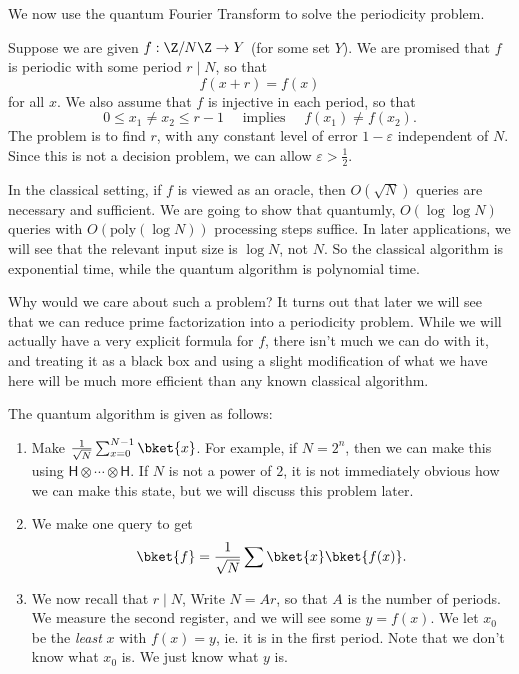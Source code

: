 \documentclass[a4paper]{article}
\newcommand{\qH}{\mathsf{H}}
\begin{document}
We now use the quantum Fourier Transform to solve the periodicity problem.
\begin{eg}
  Suppose we are given $f: \Z/N\Z \to Y$ (for some set $Y$). We are promised that $f$ is periodic with some period $r \mid N$, so that
  \[
    f(x + r) = f(x)
  \]
  for all $x$. We also assume that $f$ is injective in each period, so that
  \[
    0 \leq x_1 \not= x_2 \leq r - 1\quad\text{ implies }\quad f(x_1) \not= f(x_2).
  \]
  The problem is to find $r$, with any constant level of error $1 - \varepsilon$ independent of $N$. Since this is not a decision problem, we can allow $\varepsilon > \frac{1}{2}$.

  In the classical setting, if $f$ is viewed as an oracle, then $O(\sqrt{N})$ queries are necessary and sufficient. We are going to show that quantumly, $O(\log \log N)$ queries with $O(\mathrm{poly}(\log N))$ processing steps suffice. In later applications, we will see that the relevant input size is $\log N$, not $N$. So the classical algorithm is exponential time, while the quantum algorithm is polynomial time.

  Why would we care about such a problem? It turns out that later we will see that we can reduce prime factorization into a periodicity problem. While we will actually have a very explicit formula for $f$, there isn't much we can do with it, and treating it as a black box and using a slight modification of what we have here will be much more efficient than any known classical algorithm.

  The quantum algorithm is given as follows:
  \begin{enumerate}
    \item Make $\frac{1}{\sqrt{N}} \sum_{x = 0}^{N - 1} \bket{x}$. For example, if $N = 2^n$, then we can make this using $\qH \otimes \cdots \otimes \qH$. If $N$ is not a power of $2$, it is not immediately obvious how we can make this state, but we will discuss this problem later.

    \item We make one query to get
      \[
        \bket{f} = \frac{1}{\sqrt{N}} \sum \bket{x} \bket{f(x)}.
      \]

    \item We now recall that $r \mid N$, Write $N = Ar$, so that $A$ is the number of periods. We measure the second register, and we will see some $y = f(x)$. We let $x_0$ be the \emph{least} $x$ with $f(x) = y$, ie. it is in the first period. Note that we don't know what $x_0$ is. We just know what $y$ is.


\end{enumerate}
\end{eg}
\end{document}
